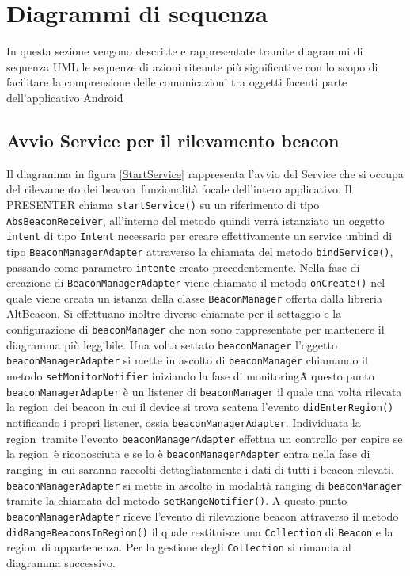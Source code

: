 \documentclass[../DefinizioneDiProdotto.tex]{subfiles}
\begin{document}
\section{Diagrammi di sequenza}

	In questa sezione vengono descritte e rappresentate tramite diagrammi di sequenza UML le sequenze di azioni ritenute più significative con lo scopo di facilitare la comprensione delle comunicazioni tra oggetti facenti parte dell'applicativo Android\g\. 
	
	\subsection{Avvio Service per il rilevamento beacon}
		Il diagramma in figura \ref{StartService} rappresenta l'avvio del Service che si occupa del rilevamento dei beacon\g\, funzionalità focale dell'intero applicativo.
	Il PRESENTER chiama \verb|startService()| su un riferimento di tipo \verb|AbsBeaconReceiver|, all'interno del metodo quindi verrà istanziato un oggetto \verb|intent| di tipo \verb|Intent| necessario per creare effettivamente un service unbind di tipo \verb|BeaconManagerAdapter| attraverso la chiamata del metodo \verb|bindService()|,  passando come parametro \verb|intente| creato precedentemente. Nella fase di creazione di \verb|BeaconManagerAdapter| viene chiamato il metodo \verb|onCreate()| nel quale viene creata un istanza della classe \verb|BeaconManager| offerta dalla libreria AltBeacon. Si effettuano inoltre diverse chiamate per il settaggio e la configurazione di \verb|beaconManager| che non sono rappresentate per mantenere il diagramma più leggibile. Una volta settato \verb|beaconManager| l'oggetto \verb|beaconManagerAdapter| si mette in ascolto di \verb|beaconManager| chiamando il metodo \verb|setMonitorNotifier| iniziando la fase di monitoring\g\.
	A questo punto \verb|beaconManagerAdapter| è un listener di \verb|beaconManager| il quale una volta rilevata la region\g\ dei beacon in cui il device si trova scatena l'evento \verb|didEnterRegion()| notificando i propri listener, ossia \verb|beaconManagerAdapter|.
	Individuata la region\g\ tramite l'evento \verb|beaconManagerAdapter| effettua un controllo per capire se la region\g\ è riconosciuta e se lo è \verb|beaconManagerAdapter| entra nella fase di ranging\g\ in cui saranno raccolti dettagliatamente i dati di tutti i beacon rilevati. \verb|beaconManagerAdapter| si mette in ascolto in modalità ranging di \verb|beaconManager| tramite la chiamata del metodo \verb|setRangeNotifier()|.
	A questo punto \verb|beaconManagerAdapter| riceve l'evento di rilevazione beacon attraverso il metodo \verb|didRangeBeaconsInRegion()| il quale restituisce una \verb|Collection| di \verb|Beacon| e la region\g\ di appartenenza.
	Per la gestione degli \verb|Collection| si rimanda al diagramma successivo.
	
\end{document}
